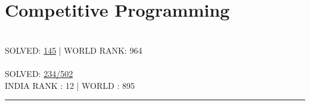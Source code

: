 \documentclass[letterpaper]{Formatting}
\begin{document}
\begin{minipage}[t]{0.3\textwidth}
\section{Competitive Programming}
\\\vspace{0.5ex}
\small\uppercase {Solved: }\href{http://www.spoj.com/users/rbavishi/}{145} | \uppercase{World Rank: 964}\\
\vspace{2ex}
\\\vspace{0.5ex}
\small \uppercase{Solved: }\href{https://projecteuler.net/profile/RJBavishi.png}{234/502} \\
\small \uppercase{India Rank : 12 | World : 895}
\vspace{1ex}
\rule{5cm}{0.5pt}
\vspace{2ex}


\end{minipage} %
\hfill
\vrule
\hspace{3ex}
%
%
\end{document}
